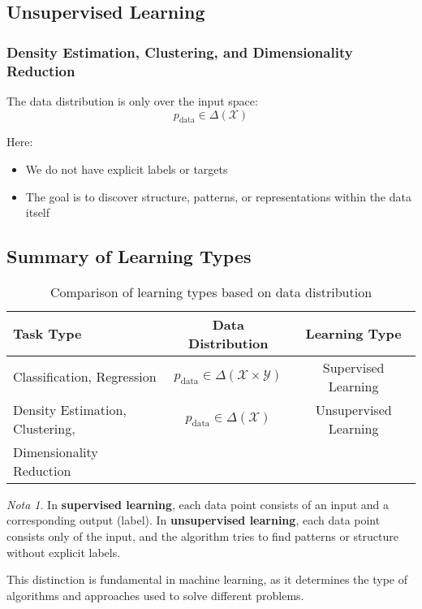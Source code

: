 \documentclass[11pt,a4paper]{article}
\theoremstyle{definition}
\theoremstyle{plain}
\theoremstyle{remark}
\newtheorem*{remark}{Nota}
\begin{document}
\subsection{Unsupervised Learning}

\subsubsection{Density Estimation, Clustering, and Dimensionality Reduction}

The data distribution is only over the input space:
\[
p_{\text{data}} \in \Delta(\mathcal{X})
\]

Here:
\begin{itemize}
    \item We do not have explicit labels or targets
    \item The goal is to discover structure, patterns, or representations within the data itself
\end{itemize}

\subsection{Summary of Learning Types}

\begin{table}[h]
\centering
\begin{tabular}{|l|c|c|}
\hline
\textbf{Task Type} & \textbf{Data Distribution} & \textbf{Learning Type} \\
\hline
Classification, Regression & $p_{\text{data}} \in \Delta(\mathcal{X} \times \mathcal{Y})$ & Supervised Learning \\
\hline
Density Estimation, Clustering, & $p_{\text{data}} \in \Delta(\mathcal{X})$ & Unsupervised Learning \\
Dimensionality Reduction & & \\
\hline
\end{tabular}
\caption{Comparison of learning types based on data distribution}
\end{table}

\begin{remark}
In \textbf{supervised learning}, each data point consists of an input and a corresponding output (label). In \textbf{unsupervised learning}, each data point consists only of the input, and the algorithm tries to find patterns or structure without explicit labels.

This distinction is fundamental in machine learning, as it determines the type of algorithms and approaches used to solve different problems.
\end{remark}
\end{document}

